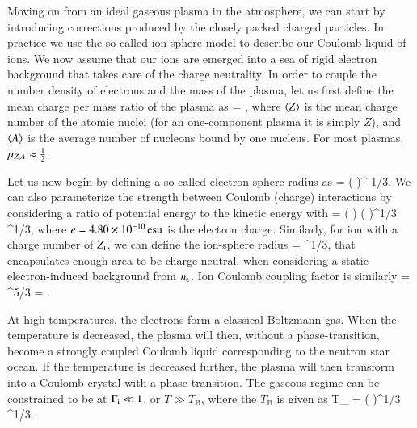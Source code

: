 Moving on from an ideal gaseous plasma in the atmosphere, we can start by introducing corrections produced by the closely packed charged particles.
In practice we use the so-called ion-sphere model to describe our Coulomb liquid of ions.
We now assume that our ions are emerged into a sea of rigid electron background that takes care of the charge neutrality.
In order to couple the number density of electrons and the mass of the plasma, let us first define the mean charge per mass ratio of the plasma as
\be
\Mu = ,
\ee
where $\langle Z \rangle$ is the mean charge number of the atomic nuclei (for an one-component plasma it is simply $Z$), and $\langle A \rangle$ is the average number of nucleons bound by one nucleus.
For most plasmas, $\mu_{Z,A} \approx \frac{1}{2}$.

Let us now begin by defining a so-called electron sphere radius as
\be
\erad = \left(  \right)^{-1/3}.
\ee
We can also parameterize the strength between Coulomb (charge) interactions by considering a ratio of potential energy to the kinetic energy with
\be
\Ge =   \left(  \right) \left(  \right)^{1/3} \Mu^{1/3},
\ee
where $e = 4.80 \times 10^{-10} \, \mathrm{esu}$ is the electron charge.
Similarly, for ion with a charge number of $Z_{\mathrm{i}}$, we can define the ion-sphere radius
\be
\irad = \erad \Zi^{1/3},
\ee
that encapsulates enough area to be charge neutral, when considering a static electron-induced background from $n_{\mathrm{e}}$.
Ion Coulomb coupling factor is similarly
\be
\Gi = \Ge \Zi^{5/3} = .
\ee

At high temperatures, the electrons form a classical Boltzmann gas.
When the temperature is decreased, the plasma will then, without a phase-transition, become a strongly coupled Coulomb liquid corresponding to the neutron star ocean.
If the temperature is decreased further, the plasma will then transform into a Coulomb crystal with a phase transition.
The gaseous regime can be constrained to be at $\Gamma_{\mathrm{i}} \ll 1$, or $T \gg T_{\mathrm{B}}$, where the $T_{\mathrm{B}}$ is given as
\be
T_{} =  \approx {} \left(  \right)^{1/3} \Mu^{1/3} \Kelvin.
\ee

